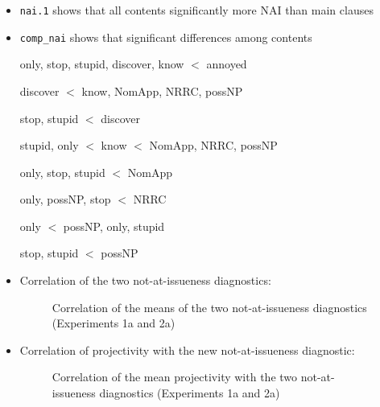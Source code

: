 \documentclass[11pt,fleqn]{article}
\newcommand{\6}{\mbox{$[\hspace*{-.6mm}[$}}
\newcommand{\9}{\mbox{$]\hspace*{-.6mm}]$}}
\begin{document}
\begin{itemize}

\item {\tt nai.1} shows that all contents significantly more NAI than main clauses

\item {\tt comp\_nai} shows that significant differences among contents

only, stop, stupid, discover, know $<$ annoyed

discover $<$ know, NomApp, NRRC, possNP

stop, stupid $<$ discover 

stupid, only $<$ know $<$ NomApp, NRRC, possNP

only, stop, stupid $<$ NomApp

only, possNP, stop $<$ NRRC

only $<$ possNP, only, stupid

stop, stupid $<$ possNP

\item Correlation of the two not-at-issueness diagnostics:

\begin{figure}[!h]

\begin{center}

\end{center}

\caption{Correlation of the means of the two not-at-issueness diagnostics (Experiments 1a and 2a)}\label{f-corr1}
\end{figure}


\item Correlation of projectivity with the new not-at-issueness diagnostic:

\begin{figure}[!h]

\begin{center}

\end{center}

\caption{Correlation of the mean projectivity with the two not-at-issueness diagnostics (Experiments 1a and 2a)}\label{f-corr2}
\end{figure}

\end{itemize}
\end{document}
